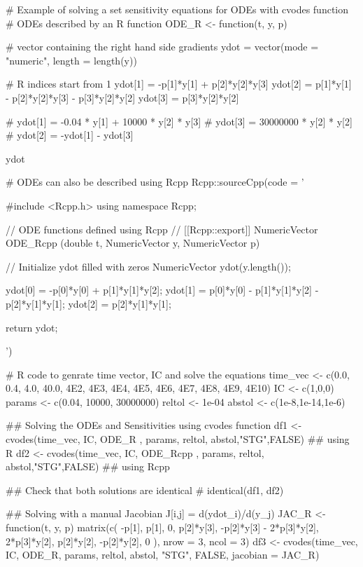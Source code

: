 \documentclass[letterpaper]{book}
\begin{document}
\begin{Examples}
\begin{ExampleCode}
# Example of solving a set sensitivity equations for ODEs with cvodes function
# ODEs described by an R function
ODE_R <- function(t, y, p){

  # vector containing the right hand side gradients
  ydot = vector(mode = "numeric", length = length(y))

  # R indices start from 1
  ydot[1] = -p[1]*y[1] + p[2]*y[2]*y[3]
  ydot[2] = p[1]*y[1] - p[2]*y[2]*y[3] - p[3]*y[2]*y[2]
  ydot[3] = p[3]*y[2]*y[2]

  # ydot[1] = -0.04 * y[1] + 10000 * y[2] * y[3]
  # ydot[3] = 30000000 * y[2] * y[2]
  # ydot[2] = -ydot[1] - ydot[3]

  ydot

}

# ODEs can also be described using Rcpp
Rcpp::sourceCpp(code = '

                #include <Rcpp.h>
                using namespace Rcpp;

                // ODE functions defined using Rcpp
                // [[Rcpp::export]]
                NumericVector ODE_Rcpp (double t, NumericVector y, NumericVector p){

                // Initialize ydot filled with zeros
                NumericVector ydot(y.length());

                ydot[0] = -p[0]*y[0] + p[1]*y[1]*y[2];
                ydot[1] = p[0]*y[0] - p[1]*y[1]*y[2] - p[2]*y[1]*y[1];
                ydot[2] = p[2]*y[1]*y[1];

                return ydot;

                }')



# R code to genrate time vector, IC and solve the equations
time_vec <- c(0.0, 0.4, 4.0, 40.0, 4E2, 4E3, 4E4, 4E5, 4E6, 4E7, 4E8, 4E9, 4E10)
IC <- c(1,0,0)
params <- c(0.04, 10000, 30000000)
reltol <- 1e-04
abstol <- c(1e-8,1e-14,1e-6)

## Solving the ODEs and Sensitivities using cvodes function
df1 <- cvodes(time_vec, IC, ODE_R , params, reltol, abstol,"STG",FALSE)           ## using R
df2 <- cvodes(time_vec, IC, ODE_Rcpp , params, reltol, abstol,"STG",FALSE)        ## using Rcpp

## Check that both solutions are identical
# identical(df1, df2)

## Solving with a manual Jacobian  J[i,j] = d(ydot_i)/d(y_j)
JAC_R <- function(t, y, p) {
  matrix(c(
    -p[1],         p[1],                        0,
     p[2]*y[3],   -p[2]*y[3] - 2*p[3]*y[2],   2*p[3]*y[2],
     p[2]*y[2],   -p[2]*y[2],                  0
  ), nrow = 3, ncol = 3)
}
df3 <- cvodes(time_vec, IC, ODE_R, params, reltol, abstol, "STG", FALSE, jacobian = JAC_R)
\end{ExampleCode}
\end{Examples}
\end{document}
